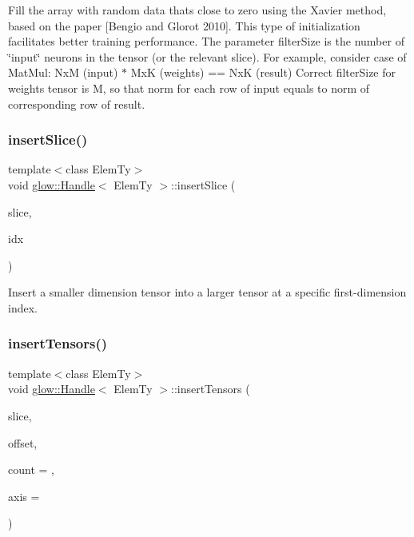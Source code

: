 Fill the array with random data that\textquotesingle{}s close to zero using the Xavier method, based on the paper \mbox{[}Bengio and Glorot 2010\mbox{]}. This type of initialization facilitates better training performance. The parameter {\ttfamily filter\+Size} is the number of \char`\"{}input\char`\"{} neurons in the tensor (or the relevant slice). For example, consider case of Mat\+Mul\+: NxM ({\ttfamily input}) $\ast$ MxK ({\ttfamily weights}) == NxK ({\ttfamily result}) Correct {\ttfamily filter\+Size} for weights tensor is M, so that norm for each row of {\ttfamily input} equals to norm of corresponding row of {\ttfamily result}. \mbox{\label{classglow_1_1_handle_a4f14f140791e25024d601c91ca2f8ced}} 
\subsubsection{\texorpdfstring{insert\+Slice()}{insertSlice()}}
{\footnotesize\ttfamily template$<$class Elem\+Ty$>$ \\
void \hyperlink{classglow_1_1_handle}{glow\+::\+Handle}$<$ Elem\+Ty $>$\+::insert\+Slice (\begin{DoxyParamCaption}\item[{const \hyperlink{classglow_1_1_tensor}{Tensor} \&}]{slice,  }\item[{size\+\_\+t}]{idx }\end{DoxyParamCaption})\hspace{0.3cm}{\ttfamily [inline]}}

Insert a smaller dimension tensor into a larger tensor at a specific first-\/dimension index. \mbox{\label{classglow_1_1_handle_a8e46eccc2e9bd998d798f19f368cf400}} 
\subsubsection{\texorpdfstring{insert\+Tensors()}{insertTensors()}}
{\footnotesize\ttfamily template$<$class Elem\+Ty$>$ \\
void \hyperlink{classglow_1_1_handle}{glow\+::\+Handle}$<$ Elem\+Ty $>$\+::insert\+Tensors (\begin{DoxyParamCaption}\item[{\hyperlink{classglow_1_1_handle}{Handle}$<$ Elem\+Ty $>$ \&}]{slice,  }\item[{llvm\+::\+Array\+Ref$<$ size\+\_\+t $>$}]{offset,  }\item[{size\+\_\+t}]{count = {},  }\item[{size\+\_\+t}]{axis = {} }\end{DoxyParamCaption})\hspace{0.3cm}{\ttfamily [inline]}}

